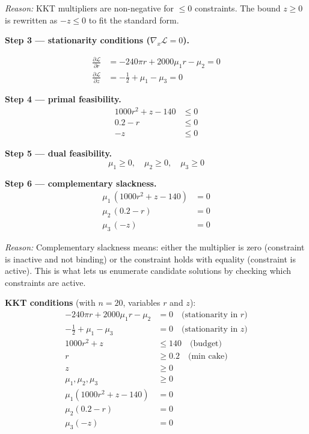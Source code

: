 \documentclass[10pt,a4paper]{article}
\newcommand{\reason}[1]{%
  \begin{mdframed}[backgroundcolor=reasonbg, linewidth=0.4pt,
    innertopmargin=3pt, innerbottommargin=3pt,
    innerleftmargin=6pt, innerrightmargin=6pt]
    \small\textit{Reason:} \small #1
  \end{mdframed}\vspace{2pt}}
\newenvironment{resultbox}{%
  \begin{mdframed}[backgroundcolor=boxbg, linewidth=0.6pt,
    innertopmargin=5pt, innerbottommargin=5pt,
    innerleftmargin=8pt, innerrightmargin=8pt]
}{\end{mdframed}}
\begin{document}
\reason{KKT multipliers are non-negative for $\le 0$ constraints. The
        bound $z\ge 0$ is rewritten as $-z\le 0$ to fit the standard form.}

\textbf{Step 3 --- stationarity conditions ($\nabla_x \mathcal{L}=0$).}

\begin{align*}
  \frac{\partial\mathcal{L}}{\partial r} &=
    -240\pi r + 2000\mu_1 r - \mu_2 = 0 \\[4pt]
  \frac{\partial\mathcal{L}}{\partial z} &=
    -\tfrac{1}{2} + \mu_1 - \mu_3 = 0
\end{align*}

\textbf{Step 4 --- primal feasibility.}
\begin{align*}
  1000r^2 + z - 140 &\le 0 \\
  0.2 - r           &\le 0 \\
  -z                &\le 0
\end{align*}

\textbf{Step 5 --- dual feasibility.}
\[
  \mu_1 \ge 0,\quad \mu_2 \ge 0,\quad \mu_3 \ge 0
\]

\textbf{Step 6 --- complementary slackness.}
\begin{align*}
  \mu_1\,(1000r^2 + z - 140) &= 0 \\
  \mu_2\,(0.2 - r)            &= 0 \\
  \mu_3\,(-z)                 &= 0
\end{align*}

\reason{Complementary slackness means: either the multiplier is zero
        (constraint is inactive and not binding) or the constraint holds
        with equality (constraint is active). This is what lets us
        enumerate candidate solutions by checking which constraints
        are active.}

\begin{resultbox}
\textbf{KKT conditions} (with $n=20$, variables $r$ and $z$):
\begin{align*}
  -240\pi r + 2000\mu_1 r - \mu_2 &= 0 \quad\text{(stationarity in }r\text{)}\\
  -\tfrac{1}{2} + \mu_1 - \mu_3   &= 0 \quad\text{(stationarity in }z\text{)}\\
  1000r^2 + z                      &\le 140 \quad\text{(budget)}\\
  r                                &\ge 0.2 \quad\text{(min cake)}\\
  z                                &\ge 0 \\
  \mu_1,\mu_2,\mu_3                &\ge 0 \\
  \mu_1(1000r^2+z-140)             &= 0 \\
  \mu_2(0.2-r)                     &= 0 \\
  \mu_3(-z)                        &= 0
\end{align*}
\end{resultbox}
\end{document}
